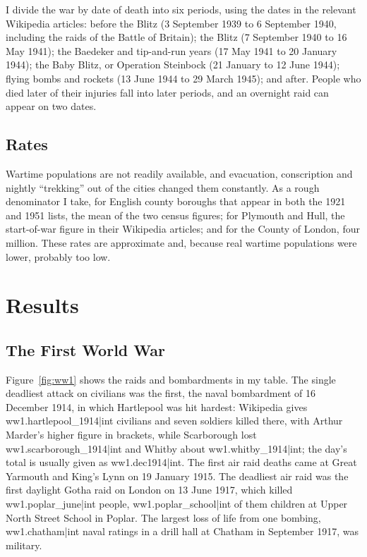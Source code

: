 \documentclass[11pt,a4paper]{article}
\begin{document}
I divide the war by date of death into six periods, using the dates in the relevant Wikipedia articles: before the Blitz (3 September 1939 to 6 September 1940, including the raids of the Battle of Britain); the Blitz (7 September 1940 to 16 May 1941); the Baedeker and tip-and-run years (17 May 1941 to 20 January 1944); the Baby Blitz, or Operation Steinbock (21 January to 12 June 1944); flying bombs and rockets (13 June 1944 to 29 March 1945); and after. People who died later of their injuries fall into later periods, and an overnight raid can appear on two dates.

\subsection{Rates}

Wartime populations are not readily available, and evacuation, conscription and nightly ``trekking'' out of the cities changed them constantly. As a rough denominator I take, for English county boroughs that appear in both the 1921 and 1951 lists, the mean of the two census figures; for Plymouth and Hull, the start-of-war figure in their Wikipedia articles; and for the County of London, four million. These rates are approximate and, because real wartime populations were lower, probably too low.

\section{Results}

\subsection{The First World War}

Figure~\ref{fig:ww1} shows the raids and bombardments in my table. The single deadliest attack on civilians was the first, the naval bombardment of 16 December 1914, in which Hartlepool was hit hardest: Wikipedia gives {{ww1.hartlepool_1914|int}} civilians and seven soldiers killed there, with Arthur Marder's higher figure in brackets, while Scarborough lost {{ww1.scarborough_1914|int}} and Whitby about {{ww1.whitby_1914|int}}; the day's total is usually given as {{ww1.dec1914|int}}. The first air raid deaths came at Great Yarmouth and King's Lynn on 19 January 1915. The deadliest air raid was the first daylight Gotha raid on London on 13 June 1917, which killed {{ww1.poplar_june|int}} people, {{ww1.poplar_school|int}} of them children at Upper North Street School in Poplar. The largest loss of life from one bombing, {{ww1.chatham|int}} naval ratings in a drill hall at Chatham in September 1917, was military.
\end{document}
